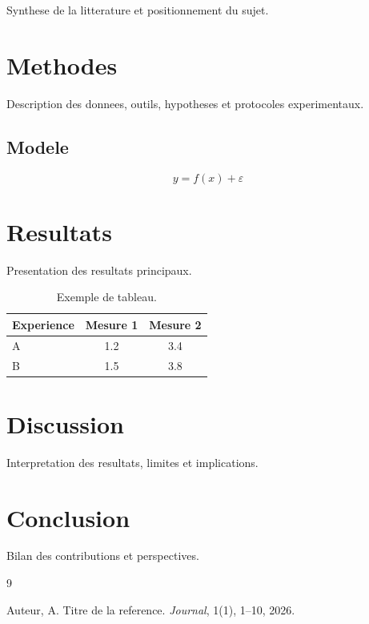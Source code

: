 \documentclass[11pt,a4paper,oneside]{book}
\begin{document}
Synthese de la litterature et positionnement du sujet.

\chapter{Methodes}

Description des donnees, outils, hypotheses et protocoles experimentaux.

\section{Modele}

\begin{equation}
  y = f(x) + \varepsilon
\end{equation}

\chapter{Resultats}

Presentation des resultats principaux.

\begin{table}[h]
  \centering
  \caption{Exemple de tableau.}
  \begin{tabular}{lcc}
    \toprule
    Experience & Mesure 1 & Mesure 2 \\
    \midrule
    A & 1.2 & 3.4 \\
    B & 1.5 & 3.8 \\
    \bottomrule
  \end{tabular}
  \label{tab:exemple}
\end{table}

\chapter{Discussion}

Interpretation des resultats, limites et implications.

\chapter{Conclusion}

Bilan des contributions et perspectives.

\backmatter

\begin{thebibliography}{9}

Auteur, A.
\newblock Titre de la reference.
\newblock \emph{Journal}, 1(1), 1--10, 2026.

\end{thebibliography}
\end{document}
